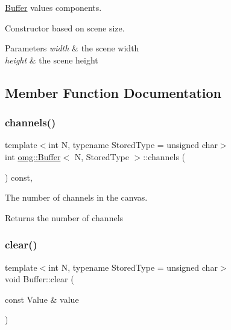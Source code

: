 \mbox{\hyperlink{classomg_1_1_buffer}{Buffer}} values components. 

Constructor based on scene size.


\begin{DoxyParams}{Parameters}
{\em width} & the scene width \\
\hline
{\em height} & the scene height \\
\hline
\end{DoxyParams}


\subsection{Member Function Documentation}
\mbox{\label{classomg_1_1_buffer_ab52287f39a698ecd026af1ca3e926f8c}} 
\subsubsection{\texorpdfstring{channels()}{channels()}}
{\footnotesize\ttfamily template$<$int N, typename Stored\+Type = unsigned char$>$ \\
int \mbox{\hyperlink{classomg_1_1_buffer}{omg\+::\+Buffer}}$<$ N, Stored\+Type $>$\+::channels (\begin{DoxyParamCaption}{ }\end{DoxyParamCaption}) const\hspace{0.3cm}{\ttfamily [inline]}, {\ttfamily [noexcept]}}



The number of channels in the canvas. 

\begin{DoxyReturn}{Returns}
the number of channels 
\end{DoxyReturn}
\mbox{\label{classomg_1_1_buffer_a817affcd52f40b49c3f8e3417747de3d}} 
\subsubsection{\texorpdfstring{clear()}{clear()}}
{\footnotesize\ttfamily template$<$int N, typename Stored\+Type = unsigned char$>$ \\
void Buffer\+::clear (\begin{DoxyParamCaption}\item[{const Value \&}]{value }\end{DoxyParamCaption})}



